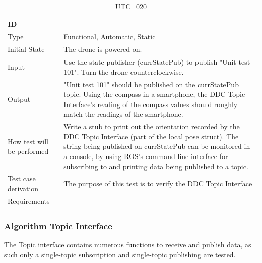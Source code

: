 \documentclass[12pt, titlepage]{article}
\begin{document}
\begin{table}[!h]
\begin{center}
\caption {UTC\_020}
\label{tab:UTC_020}
\begin{tabular}{ | m{3.2cm} | m{12.2cm} | } 
\hline
ID & \nameref{tab:UTC_020} \\ 
\hline
Type &  Functional, Automatic, Static  \\ 
\hline
Initial State & The drone is powered on. \\ 
\hline
Input & Use the state publisher (currStatePub) to publish "Unit test 101". Turn the drone counterclockwise. \\ 
\hline
Output &  "Unit test 101" should be published on the currStatePub topic. Using the compass in a smartphone, the DDC Topic Interface's reading of the compass values should roughly match the readings of the smartphone. \\ 
\hline
How test will be performed & Write a stub to print out the orientation recorded by the DDC Topic Interface (part of the local pose struct). The string being published on currStatePub can be monitored in a console, by using ROS's command line interface for subscribing to and printing data being published to a topic. \\ 
\hline
Test case derivation & The purpose of this test is to verify the DDC Topic Interface \\ 
\hline
Requirements &  \\ 
\hline
\end{tabular}
\end{center}
\end{table}

\clearpage

\subsubsection{Algorithm Topic Interface}

The Topic interface contains numerous functions to receive and publish data, as such only a single-topic subscription and single-topic publishing are tested.
\end{document}
